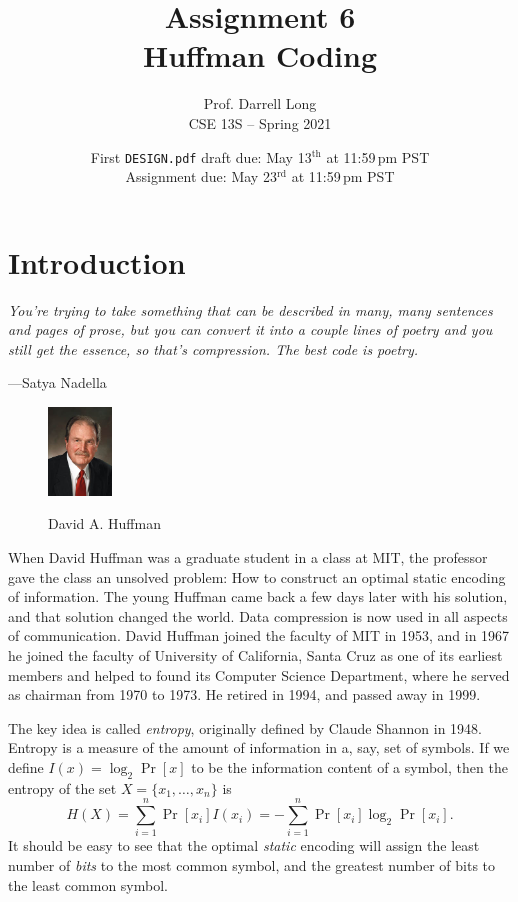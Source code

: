 \documentclass[11pt]{article}
\title{Assignment 6 \\ Huffman Coding}
\author{Prof. Darrell Long \\ CSE 13S -- Spring 2021}
\date{
  First \texttt{DESIGN.pdf} draft due: May 13$^\text{th}$ at 11:59\,pm PST \\
  Assignment due: May 23$^\text{rd}$ at 11:59\,pm PST
}
\begin{document}
\maketitle

\section{Introduction}

\textwidth
\epigraph{\emph{You're trying to take something that can be described in
many, many sentences and pages of prose, but you can convert it into a couple
lines of poetry and you still get the essence, so that's compression.
The best code is poetry.}}{---Satya Nadella}

\begin{figure}
  \begin{center}
\includegraphics[width=0.15\textwidth]{images/huffman.jpg}
\centerline{\small David A. Huffman}
  \end{center}
\end{figure}

When David Huffman was a graduate student in a class at MIT, the
professor gave the class an unsolved problem: How to construct an
optimal static encoding of information. The young Huffman came back
a few days later with his solution, and that solution changed the
world. Data compression is now used in all aspects of communication.
David Huffman joined the faculty of MIT in 1953, and in 1967 he
joined the faculty of University of California, Santa Cruz as one
of its earliest members and helped to found its Computer Science
Department, where he served as chairman from 1970 to 1973. He retired
in 1994, and passed away in 1999.

The key idea is called \emph{entropy}, originally defined by Claude Shannon in
1948. Entropy is a measure of the amount of information in a, say, set of
symbols. If we define $I(x) = \log_2 \Pr[x]$ to be the information content of
a symbol, then the entropy of the set $X=\{x_1, \ldots, x_n \}$ is
$$
H(X) = \sum_{i=1}^n \Pr[x_i] I(x_i) = - \sum_{i=1}^n \Pr[x_i] \log_2 \Pr[x_i].
$$
It should be easy to see that the optimal \emph{static} encoding will assign
the least number of \emph{bits} to the most common symbol, and the greatest
number of bits to the least common symbol.
\end{document}
